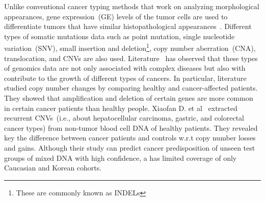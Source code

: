 \hspace*{3.5mm} Unlike conventional cancer typing methods that work on analyzing morphological appearances, gene expression~(GE) levels of the tumor cells are used to differentiate tumors that have similar histopathological appearances~\cite{paroder2006na+}. Different types of somatic mutations data such as point mutation, single nucleotide variation~(SNV), small insertion and deletion\footnote{These are commonly known as INDELs}, copy number aberration~(CNA), translocation, and CNVs are also used. Literature~\cite{yuan2018cancer} has observed that these types of genomics data are not only associated with complex diseases but also with contribute to the growth of different types of cancers. In particular, literature~\cite{67Calcagno} studied copy number changes by comparing healthy and cancer-affected patients. They showed that amplification and deletion of certain genes are more common in certain cancer patients than healthy people. Xiaofan D. et al~\cite{ding2014application} extracted recurrent CNVs~(i.e., about hepatocellular carcinoma, gastric, and colorectal cancer types) from non-tumor blood cell DNA of healthy patients. They revealed key the difference between cancer patients and controls w.r.t copy number losses and gains. Although their study can predict cancer predisposition of unseen test groups of mixed DNA with high confidence, a has limited coverage of only Caucasian and Korean cohorts. 



